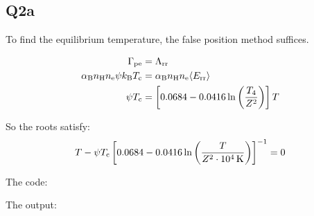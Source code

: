 \subsection{Q2a}

To find the equilibrium temperature, the false position method suffices.

\begin{align}
    \Gamma_{\rm pe} &= \Lambda_{\rm rr} \\
    \alpha_{\rm B} n_{\rm H} n_{\rm e} \psi k_{\rm B} T_{\rm c} &= \alpha_{\rm B} n_{\rm H} n_{\rm e} \langle E_{\rm rr} \rangle \\
    \psi T_{\rm c} &= \left[0.0684 - 0.0416 \ln\left( \frac{T_{4}}{Z^2} \right) \right]T
\end{align}

So the roots satisfy:
\begin{equation}
    T - \psi T_{\rm c} \left[0.0684 - 0.0416 \ln\left( \frac{T}{Z^2 \cdot 10^{4} \rm \, K} \right) \right]^{-1} = 0
\end{equation}

\noindent The code:



\noindent The output:


